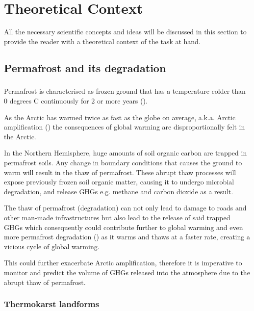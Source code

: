 \chapter{Theoretical Context} \label{lit_review}

All the necessary scientific concepts and ideas will be discussed in this section to provide the reader with a theoretical context of the task at hand.

\section{Permafrost and its degradation}  \label{perma_intro}
\paragraph{}
Permafrost is characterised as frozen ground that has a temperature colder than 0 degrees C continuously for 2 or more years (\cite{everdingen_multi-language_1998}).

As the Arctic has warmed twice as fast as the globe on average, \gls{a.k.a.} Arctic amplification (\cite{climatechangefur}) the consequences of global warming are disproportionally felt in the Arctic. 

In the Northern Hemisphere, huge amounts of soil organic carbon are trapped in permafrost soils. Any change in boundary conditions that causes the ground to warm will result in the thaw of permafrost. These abrupt thaw processes will expose previously frozen soil organic matter, causing it to undergo microbial degradation, and release GHGs e.g. methane and carbon dioxide as a result.

The thaw of permafrost (degradation) can not only lead to damage to roads and other man-made infrastructures but also lead to the release of said trapped GHGs which consequently could contribute further to global warming and even more permafrost degradation (\cite{MURTON2021857}) as it warms and thaws at a faster rate, creating a vicious cycle of global warming.

This could further exacerbate Arctic amplification, therefore it is imperative to monitor and predict the volume of GHGs released into the atmosphere due to the abrupt thaw of permafrost.

\subsection{Thermokarst landforms}  \label{thermokarst_intro}

